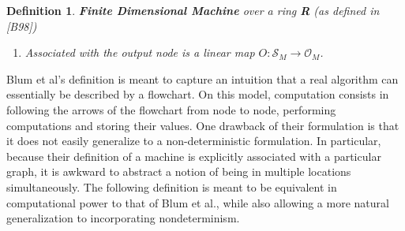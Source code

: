 \documentclass[twoside]{article}
\newcommand{\functype}[3]{$#1:#2 \rightarrow #3$}
\newcommand{\outspace}[0]{\mathcal{O}}
\newcommand{\statespace}[0]{\mathcal{S}}
\renewcommand{\cite}[1]{[#1]}
\newtheorem{definition}{Definition}[section]
\begin{document}
\begin{definition}{\textbf{Finite Dimensional Machine} over a ring
    \textbf{R} (as defined in \cite{B98})}
\begin{enumerate}
  \item Associated with the output node is a linear map
    \functype{O}{\statespace_M}{\outspace_M}.
    
  \end{enumerate}
\end{definition}

Blum et al's definition is meant to capture an intuition that a real
algorithm can essentially be described by a flowchart.  On this model,
computation consists in following the arrows of the flowchart from
node to node, performing computations and storing their values.  One
drawback of their formulation is that it does not easily generalize to
a non-deterministic formulation.  In particular, because their
definition of a machine is explicitly associated with a particular
graph, it is awkward to abstract a notion of being in multiple
locations simultaneously.  The following definition is meant to be
equivalent in computational power to that of Blum et al., while also
allowing a more natural generalization to incorporating nondeterminism.
\end{document}
